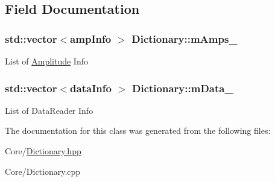 \subsection{Field Documentation}
\hypertarget{class_dictionary_a66f7d2e3126aed512fde427b21cdc996}{
\subsubsection[{m\-Amps\-\_\-}]{\setlength{\rightskip}{0pt plus 5cm}std\-::vector$<${\bf amp\-Info} $>$ Dictionary\-::m\-Amps\-\_\-\hspace{0.3cm}{\ttfamily [protected]}}}\label{class_dictionary_a66f7d2e3126aed512fde427b21cdc996}
List of \hyperlink{class_amplitude}{Amplitude} Info \hypertarget{class_dictionary_a9025a141243715d7b87d31c0719184f8}{
\subsubsection[{m\-Data\-\_\-}]{\setlength{\rightskip}{0pt plus 5cm}std\-::vector$<${\bf data\-Info} $>$ Dictionary\-::m\-Data\-\_\-\hspace{0.3cm}{\ttfamily [protected]}}}\label{class_dictionary_a9025a141243715d7b87d31c0719184f8}
List of Data\-Reader Info 

The documentation for this class was generated from the following files\-:\begin{DoxyCompactItemize}
\item 
Core/\hyperlink{_dictionary_8hpp}{Dictionary.\-hpp}\item 
Core/Dictionary.\-cpp\end{DoxyCompactItemize}
